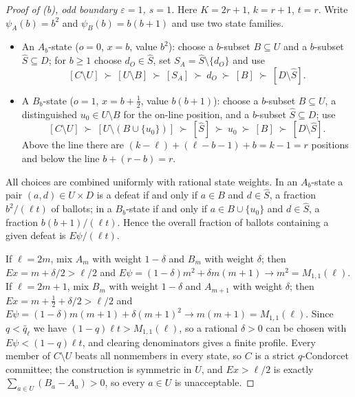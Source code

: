 \documentclass[11pt]{article}
\theoremstyle{plain}
\theoremstyle{definition}
\newcommand{\eps}{\varepsilon}
\begin{document}
\begin{proof}[Proof of (b), odd boundary $\eps=1$, $s=1$]
Here $K=2r+1$, $k=r+1$, $t=r$. Write $\psi_A(b)=b^2$ and $\psi_B(b)=b(b+1)$ and use two state families.

\begin{itemize}
\item An $A_b$-state ($o=0$, $x=b$, value $b^2$): choose a $b$-subset $B\subseteq U$ and a $b$-subset $\widehat S\subseteq D$; for $b\ge1$ choose $d_O\in\widehat S$, set $S_A=\widehat S\setminus\{d_O\}$ and use
\[
[C\setminus U]\ \succ\ [U\setminus B]\ \succ\ [S_A]\ \succ\ d_O\ \succ\ [B]\ \succ\ [D\setminus\widehat S].
\]
\item A $B_b$-state ($o=1$, $x=b+\tfrac12$, value $b(b+1)$): choose a $b$-subset $B\subseteq U$, a distinguished $u_0\in U\setminus B$ for the on-line position, and a $b$-subset $\widehat S\subseteq D$; use
\[
[C\setminus U]\ \succ\ [U\setminus(B\cup\{u_0\})]\ \succ\ [\widehat S]\ \succ\ u_0\ \succ\ [B]\ \succ\ [D\setminus\widehat S].
\]
Above the line there are $(k-\ell)+(\ell-b-1)+b=k-1=r$ positions and below the line $b+(r-b)=r$.
\end{itemize}

All choices are combined uniformly with rational state weights. In an $A_b$-state a pair $(a,d)\in U\times D$ is a defeat if and only if $a\in B$ and $d\in\widehat S$, a fraction $b^2/(\ell t)$ of ballots; in a $B_b$-state if and only if $a\in B\cup\{u_0\}$ and $d\in\widehat S$, a fraction $b(b+1)/(\ell t)$. Hence the overall fraction of ballots containing a given defeat is $E\psi/(\ell t)$.

If $\ell=2m$, mix $A_m$ with weight $1-\delta$ and $B_m$ with weight $\delta$; then $Ex=m+\delta/2>\ell/2$ and $E\psi=(1-\delta)m^2+\delta m(m+1)\to m^2=M_{1,1}(\ell)$. If $\ell=2m+1$, mix $B_m$ with weight $1-\delta$ and $A_{m+1}$ with weight $\delta$; then $Ex=m+\frac12+\delta/2>\ell/2$ and $E\psi=(1-\delta)m(m+1)+\delta(m+1)^2\to m(m+1)=M_{1,1}(\ell)$. Since $q<\bar q_\ell$ we have $(1-q)\ell t>M_{1,1}(\ell)$, so a rational $\delta>0$ can be chosen with $E\psi<(1-q)\ell t$, and clearing denominators gives a finite profile. Every member of $C\setminus U$ beats all nonmembers in every state, so $C$ is a strict $q$-Condorcet committee; the construction is symmetric in $U$, and $Ex>\ell/2$ is exactly $\sum_{a\in U}(B_a-A_a)>0$, so every $a\in U$ is unacceptable.
\end{proof}
\end{document}
